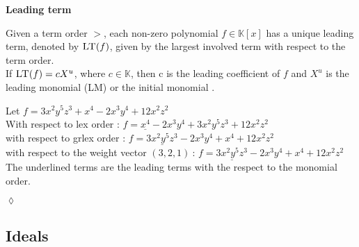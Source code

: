 \textbf{Leading term}

Given a term order $>$, each non-zero polynomial $f \in \mathbb{K}\left[ x\right] $ has a unique leading term, denoted by $\textsc{LT}(f)$, given by the largest involved term with respect to the term order.\\
If $\textsc{LT}(f) = cX^{u}$, where $c \in \mathbb{K}$, then c is the leading coefficient of $f$ and $X^{u}$ is the leading monomial (\textsc{LM}) or the initial monomial \cite{KHZ}.\\

\begin{env_example}\normalfont

Let $ f = 3x^{2}y^{5}z^{3} + x^{4} -2x^{3}y^{4} + 12x^{2}z^{2}$ \\
With respect to lex order : $f = \underline{x^{4}} -2x^{3}y^{4} + 3x^{2}y^{5}z^{3} + 12x^{2}z^{2} $ \\
with respect to grlex order : $f = \underline{3x^{2}y^{5}z^{3}} -2x^{3}y^{4} + x^{4}+ 12x^{2}z^{2}$  \\
with respect to the weight vector $\left(3,2,1\right)~$: $f = \underline{3x^{2}y^{5}z^{3}} -2x^{3}y^{4} + x^{4}+ 12x^{2}z^{2}$  \\ 
The underlined terms are the leading terms with the respect to the monomial order.
\begin{flushright}
$\lozenge$
\end{flushright} 
\end{env_example}


\newpage
\subsection{Ideals}
\label{subsec:Ideals}

